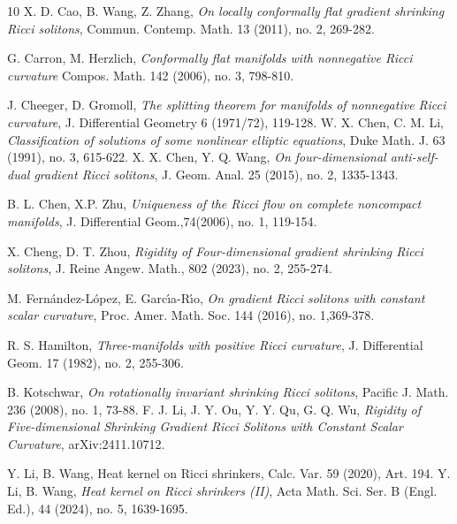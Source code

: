 \documentclass[12pt]{amsart}
\begin{document}
\begin{thebibliography}{10}
		X. D. Cao, B. Wang, Z. Zhang, {\em On locally conformally flat gradient shrinking Ricci solitons}, Commun. Contemp. Math. 13 (2011), no. 2, 269-282.

		G. Carron, M. Herzlich, {\em Conformally flat manifolds with nonnegative Ricci curvature}
		Compos. Math. 142 (2006), no. 3, 798-810.







		
		
		J. Cheeger, D. Gromoll, {\em The splitting theorem for manifolds of nonnegative Ricci curvature}, J. Differential Geometry 6 (1971/72), 119-128.
		W. X. Chen, C. M. Li,   {\em Classification of solutions of some nonlinear elliptic equations}, Duke Math. J. 63 (1991), no. 3, 615-622.
		X. X. Chen, Y. Q. Wang, {\em On four-dimensional anti-self-dual gradient Ricci solitons}, J. Geom. Anal. 25 (2015), no. 2, 1335-1343.
		
		 B. L. Chen, X.P. Zhu, {\em Uniqueness of the Ricci flow on complete noncompact manifolds}, J. Differential Geom.,74(2006), no. 1, 119-154.
		
		
		
		X. Cheng, D. T. Zhou, {\em Rigidity of Four-dimensional gradient shrinking Ricci solitons}, J. Reine Angew. Math., 802 (2023), no. 2, 255-274.
		
		
		
	
		
		M. Fern\'{a}ndez-L\'{o}pez, E. Garc\'{\i}a-R\'{\i}o, {\em On gradient Ricci solitons with constant scalar curvature}, Proc. Amer. Math. Soc. 144 (2016), no. 1,369-378.
		
		R. S. Hamilton, {\em Three-manifolds with positive Ricci curvature}, J. Differential Geom.  17  (1982), no. 2, 255-306.
		
		
		
		B. Kotschwar, {\em On rotationally invariant shrinking Ricci solitons}, Pacific J. Math. 236 (2008), no. 1, 73-88.
		F. J. Li, J. Y. Ou, Y. Y. Qu, G. Q. Wu, {\em Rigidity of Five-dimensional Shrinking Gradient Ricci Solitons with Constant Scalar Curvature}, arXiv:2411.10712.
		
 Y. Li, B. Wang, Heat kernel on Ricci shrinkers, Calc. Var. 59 (2020), Art. 194.
Y. Li, B. Wang, {\em  Heat kernel on Ricci shrinkers (II)}, Acta Math. Sci. Ser. B (Engl. Ed.), 44 (2024), no. 5, 1639-1695.
		

\end{thebibliography}
\end{document}
